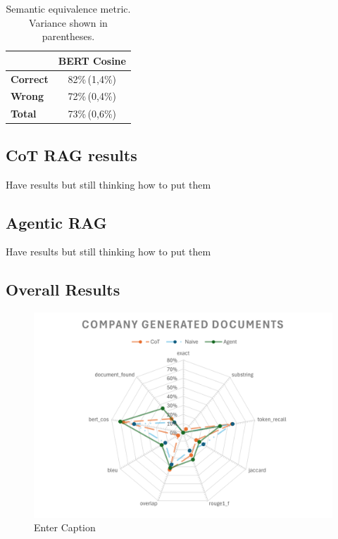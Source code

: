 \begin{table}[h]
\centering
\begin{tabular}{lc}
\hline
 & BERT Cosine \\
\hline
\textbf{Correct} & 82\%\,(1,4\%) \\
\textbf{Wrong}   & 72\%\,(0,4\%) \\
\textbf{Total}   & 73\%\,(0,6\%) \\
\hline
\end{tabular}
\caption{Semantic equivalence metric. Variance shown in parentheses.}
\end{table}

\subsection{CoT RAG results}
Have results but still thinking how to put them
\subsection{Agentic RAG}
Have results but still thinking how to put them

%


\subsection{Overall Results}
\begin{figure}
    \centering
    \includegraphics[width=1\linewidth]{Figures/Company Generated Documents.png}
    \caption{Enter Caption}
    \label{fig:placeholder}
\end{figure}





